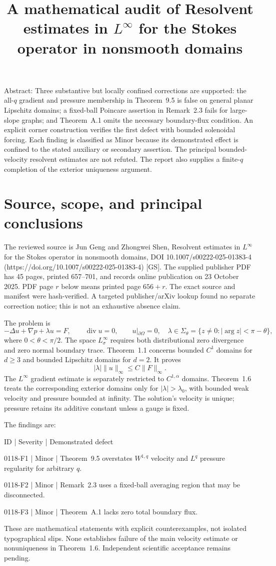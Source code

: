 \documentclass[10pt]{article}
\title{A mathematical audit of
Resolvent estimates in \(L^\infty\) for the Stokes operator in nonsmooth domains}
\author{}
\date{}
\begin{document}
\maketitle
Abstract: Three substantive but locally confined corrections are supported: the all-\(q\) gradient and pressure membership in Theorem 9.5 is false on general planar Lipschitz domains; a fixed-ball Poincare assertion in Remark 2.3 fails for large-slope graphs; and Theorem A.1 omits the necessary boundary-flux condition. An explicit corner construction verifies the first defect with bounded solenoidal forcing. Each finding is classified as Minor because its demonstrated effect is confined to the stated auxiliary or secondary assertion. The principal bounded-velocity resolvent estimates are not refuted. The report also supplies a finite-\(q\) completion of the exterior uniqueness argument.\par
\section*{Source, scope, and principal conclusions}
The reviewed source is Jun Geng and Zhongwei Shen, Resolvent estimates in \(L^\infty\) for the Stokes operator in nonsmooth domains, DOI 10.1007/s00222-025-01383-4 (https://doi.org/10.1007/s00222-025-01383-4) [GS]. The supplied publisher PDF has 45 pages, printed 657–701, and records online publication on 23 October 2025. PDF page \(r\) below means printed page \(656+r\). The exact source and manifest were hash-verified. A targeted publisher/arXiv lookup found no separate correction notice; this is not an exhaustive absence claim.\par
The problem is \[-\Delta u+\nabla p+\lambda u=F,\qquad
 \operatorname{div}u=0,\qquad u|_{\partial\Omega}=0,
 \quad
 \lambda\in\Sigma_\theta
 =\{z\ne0:|\arg z|<\pi-\theta\},\] where \(0<\theta<\pi/2\). The space \(L^\infty_\sigma\) requires both distributional zero divergence and zero normal boundary trace. Theorem 1.1 concerns bounded \(C^1\) domains for \(d\ge3\) and bounded Lipschitz domains for \(d=2\). It proves \[|\lambda|\|u\|_\infty\le C\|F\|_\infty.\] The \(L^\infty\) gradient estimate is separately restricted to \(C^{1,\alpha}\) domains. Theorem 1.6 treats the corresponding exterior domains only for \(|\lambda|>\lambda_0\), with bounded weak velocity and pressure bounded at infinity. The solution’s velocity is unique; pressure retains its additive constant unless a gauge is fixed.\par
The findings are:\par
ID | Severity | Demonstrated defect\par
0118-F1 | Minor | Theorem 9.5 overstates \(W^{1,q}\) velocity and \(L^q\) pressure regularity for arbitrary \(q\).\par
0118-F2 | Minor | Remark 2.3 uses a fixed-ball averaging region that may be disconnected.\par
0118-F3 | Minor | Theorem A.1 lacks zero total boundary flux.\par
These are mathematical statements with explicit counterexamples, not isolated typographical slips. None establishes failure of the main velocity estimate or nonuniqueness in Theorem 1.6. Independent scientific acceptance remains pending.\par
\end{document}

